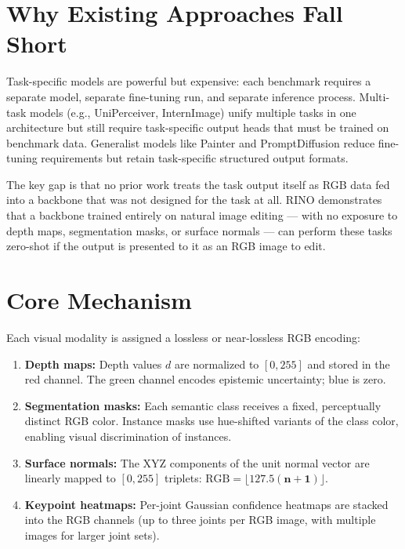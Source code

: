 \documentclass[10pt,twocolumn]{article}
\begin{document}
\section{Why Existing Approaches Fall Short}

Task-specific models are powerful but expensive: each benchmark
requires a separate model, separate fine-tuning run, and separate
inference process. Multi-task models (e.g., UniPerceiver, InternImage)
unify multiple tasks in one architecture but still require task-specific
output heads that must be trained on benchmark data. Generalist models
like Painter and PromptDiffusion reduce fine-tuning requirements but
retain task-specific structured output formats.

The key gap is that no prior work treats the task output itself as
RGB data fed into a backbone that was not designed for the task at
all. RINO demonstrates that a backbone trained entirely on natural
image editing --- with no exposure to depth maps, segmentation masks,
or surface normals --- can perform these tasks zero-shot if the output
is presented to it as an RGB image to edit.

\section{Core Mechanism}

Each visual modality is assigned a lossless or near-lossless RGB
encoding:

\begin{enumerate}[itemsep=2pt,parsep=0pt]
  \item \textbf{Depth maps:} Depth values $d$ are normalized to
    $[0, 255]$ and stored in the red channel. The green channel
    encodes epistemic uncertainty; blue is zero.
  \item \textbf{Segmentation masks:} Each semantic class receives a
    fixed, perceptually distinct RGB color. Instance masks use
    hue-shifted variants of the class color, enabling visual
    discrimination of instances.
  \item \textbf{Surface normals:} The XYZ components of the unit
    normal vector are linearly mapped to $[0, 255]$ triplets:
    $\text{RGB} = \lfloor 127.5(\mathbf{n} + \mathbf{1}) \rfloor$.
  \item \textbf{Keypoint heatmaps:} Per-joint Gaussian confidence
    heatmaps are stacked into the RGB channels (up to three joints
    per RGB image, with multiple images for larger joint sets).
\end{enumerate}
\end{document}
